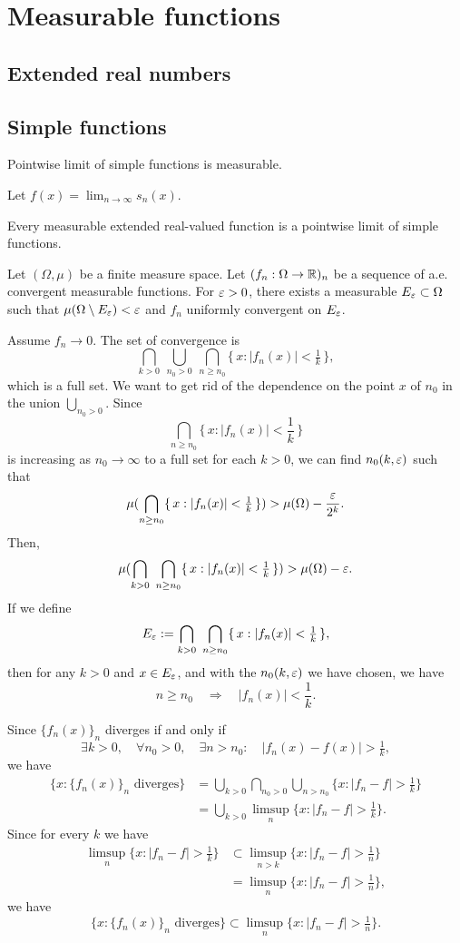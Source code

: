 \documentclass{../note}
\begin{document}
\chapter{Measurable functions}

\section{Extended real numbers}


\section{Simple functions}
Pointwise limit of simple functions is measurable.
\begin{pf}
Let $f(x)=\lim_{n\to\infty}s_n(x)$.

\end{pf}

Every measurable extended real-valued function is a pointwise limit of simple functions.





\begin{prb}
Let $(\Omega,\mu)$ be a finite measure space.
Let $(f_n:\Omega\to\mathbb{R})_n$ be a sequence of a.e. convergent measurable functions.
For $\varepsilon>0$, there exists a measurable $E_\varepsilon\subset\Omega$ such that $\mu(\Omega\setminus E_\varepsilon)<\varepsilon$ and $f_n$ uniformly convergent on $E_\varepsilon$.
\end{prb}
\begin{pf}
Assume $f_n\to0$.
The set of convergence is
\[\bigcap_{k>0}\ \bigcup_{n_0>0}\ \bigcap_{n\ge n_0}\{\,x:|f_n(x)|<\tfrac1k\,\},\]
which is a full set.
We want to get rid of the dependence on the point $x$ of $n_0$ in the union $\bigcup_{n_0>0}$.
Since
\[\bigcap_{n\ge n_0}\{\,x:|f_n(x)|<\frac1k\,\}\]
is increasing as $n_0\to\infty$ to a full set for each $k>0$, we can find $n_0(k,\varepsilon)$ such that
\[\mu(\bigcap_{n\ge n_0}\{\,x:|f_n(x)|<\tfrac1k\,\})>\mu(\Omega)-\frac{\varepsilon}{2^k}.\]
Then,
\[\mu(\bigcap_{k>0}\ \bigcap_{n\ge n_0}\{\,x:|f_n(x)|<\tfrac1k\,\})>\mu(\Omega)-\varepsilon.\]
If we define
\[E_\e:=\bigcap_{k>0}\ \bigcap_{n\ge n_0}\{\,x:|f_n(x)|<\tfrac1k\,\},\]
then for any $k>0$ and $x\in E_\varepsilon$, and with the $n_0(k,\varepsilon)$ we have chosen,
we have
\[n\ge n_0\quad\Rightarrow\quad |f_n(x)|<\frac1k.\]
\end{pf}



Since $\{f_n(x)\}_n$ diverges if and only if
\[\exists k>0,\quad\forall n_0>0,\quad\exists n>n_0:\quad|f_n(x)-f(x)|>\tfrac1k,\]
we have
\begin{align*}
\{x:\{f_n(x)\}_n\text{ diverges}\}
&=\bigcup_{k>0}\bigcap_{n_0>0}\bigcup_{n>n_0}\{x:|f_n-f|>\tfrac1k\}\\
&=\bigcup_{k>0}\limsup_n\{x:|f_n-f|>\tfrac1k\}.
\end{align*}
Since for every $k$ we have
\begin{align*}
\limsup_n\{x:|f_n-f|>\tfrac1k\}
&\subset\limsup_{n>k}\{x:|f_n-f|>\tfrac1n\}\\
&=\limsup_n\{x:|f_n-f|>\tfrac1n\},
\end{align*}
we have
\[\{x:\{f_n(x)\}_n\text{ diverges}\}\subset\limsup_n\{x:|f_n-f|>\tfrac1n\}.\]
\end{document}
